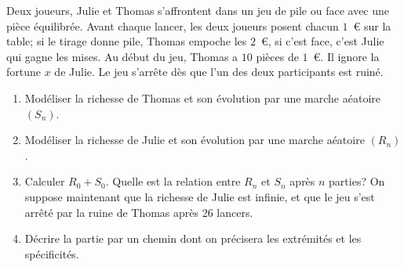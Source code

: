 \documentclass[11pt]{td_um}
\begin{document}
\begin{exo}{} %
Deux joueurs, Julie et Thomas s'affrontent dans un jeu de pile ou face avec une pi\`ece équilibrée. Avant chaque lancer, les deux joueurs posent chacun $1$~\euro{} sur la table; si le tirage donne pile, Thomas empoche les $2$~\euro{}, si c'est face, c'est Julie qui gagne les mises. Au début du jeu, Thomas a $10$ pi\`eces de $1$~\euro{}. Il ignore la fortune $x$ de Julie. Le jeu s'arrête d\`es que l'un des deux participants est ruiné.
\begin{enumerate}
    \item  Modéliser la richesse de Thomas et son évolution par une marche aéatoire $(S_n)$.
    \item  Modéliser la richesse de Julie et son évolution par une marche aéatoire $(R_n)$.
    \item  Calculer $R_0+S_0$. Quelle est la relation entre $R_n$ et $S_n$ apr\`es $n$ parties?
        On suppose maintenant que la richesse de Julie est infinie, et que le jeu s'est arrêté par la ruine de Thomas apr\`es 26 lancers.
    \item  Décrire la partie par un chemin dont on précisera les extrémités et les spécificités.

\end{enumerate}
\end{exo}
\end{document}
